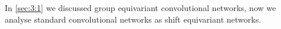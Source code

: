 \documentclass[../3.tex]{subfiles}
\begin{document}
    In \autoref{sec:3:1} we discussed group equivariant convolutional networks, now we analyse standard convolutional networks as shift equivariant networks.
\end{document}
